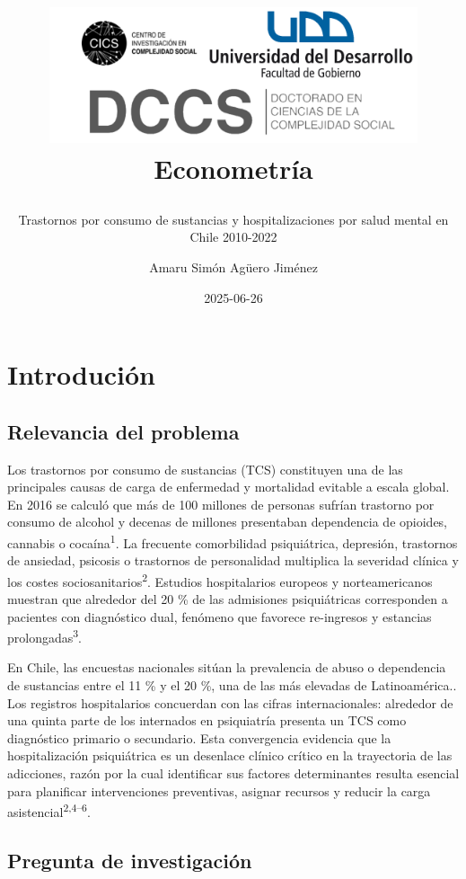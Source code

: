 \documentclass[
  spanish,
  10pt,
]{article}
\title{\begin{center}
  \includegraphics[height=4cm]{logo.png} \\[1cm]
  \Large Econometría \\
\end{center}}
\subtitle{Trastornos por consumo de sustancias y hospitalizaciones por
salud mental en Chile 2010-2022}
\author{Amaru Simón Agüero Jiménez}
\date{2025-06-26}
\renewcommand*\contentsname{Tabla de contenidos}
\newcommand\contentsname{Tabla de contenidos}
\begin{document}
\maketitle

\renewcommand*\contentsname{Tabla de contenidos}
{
\hypersetup{linkcolor=}
\setcounter{tocdepth}{3}
\tableofcontents
}

\newpage

\section{Introdución}\label{introduciuxf3n}

\subsection{Relevancia del problema}\label{relevancia-del-problema}

Los trastornos por consumo de sustancias (TCS) constituyen una de las
principales causas de carga de enfermedad y mortalidad evitable a escala
global. En 2016 se calculó que más de 100 millones de personas sufrían
trastorno por consumo de alcohol y decenas de millones presentaban
dependencia de opioides, cannabis o cocaína\textsuperscript{1}. La
frecuente comorbilidad psiquiátrica, depresión, trastornos de ansiedad,
psicosis o trastornos de personalidad multiplica la severidad clínica y
los costes sociosanitarios\textsuperscript{2}. Estudios hospitalarios
europeos y norteamericanos muestran que alrededor del 20 \% de las
admisiones psiquiátricas corresponden a pacientes con diagnóstico dual,
fenómeno que favorece re-ingresos y estancias
prolongadas\textsuperscript{3}.

En Chile, las encuestas nacionales sitúan la prevalencia de abuso o
dependencia de sustancias entre el 11 \% y el 20 \%, una de las más
elevadas de Latinoamérica.. Los registros hospitalarios concuerdan con
las cifras internacionales: alrededor de una quinta parte de los
internados en psiquiatría presenta un TCS como diagnóstico primario o
secundario. Esta convergencia evidencia que la hospitalización
psiquiátrica es un desenlace clínico crítico en la trayectoria de las
adicciones, razón por la cual identificar sus factores determinantes
resulta esencial para planificar intervenciones preventivas, asignar
recursos y reducir la carga asistencial\textsuperscript{2,4--6}.

\subsection{Pregunta de
investigación}\label{pregunta-de-investigaciuxf3n}
\end{document}
